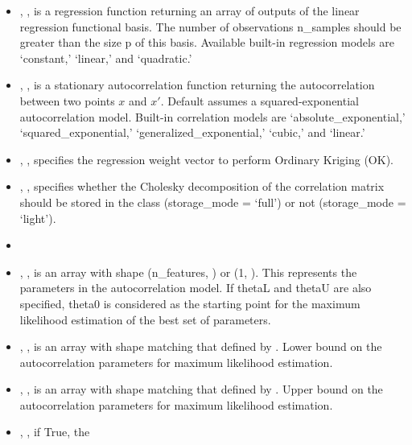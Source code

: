 
\begin{itemize}
  \item {}, , is a regression
  function returning an array of outputs of the linear regression functional
  basis.
  The number of observations n\_samples should be greater than the size p of
  this basis.
  Available built-in regression models are `constant,' `linear,' and
  `quadratic.'
  \item {}, , is a stationary
  autocorrelation function returning the autocorrelation between two points $x$
  and $x'$.
  Default assumes a squared-exponential autocorrelation model.
  Built-in correlation models are `absolute\_exponential,'
  `squared\_exponential,' `generalized\_exponential,' `cubic,' and `linear.'
  \item {}, , specifies
  the regression weight vector to perform Ordinary Kriging (OK).
  \item {}, , specifies
  whether the Cholesky decomposition of the correlation matrix should be stored
  in the class (storage\_mode = `full') or not (storage\_mode = `light').
  \item {}
  \item {}, , is an
  array with shape (n\_features, ) or (1, ).
  This represents the parameters in the autocorrelation model.
  If thetaL and thetaU are also specified, theta0 is considered as the starting
  point for the maximum likelihood estimation of the best set of parameters.
  \item {}, , is an
  array with shape matching that defined by .
  Lower bound on the autocorrelation parameters for maximum likelihood
  estimation.
  \item {}, , is an
  array with shape matching that defined by .
  Upper bound on the autocorrelation parameters for maximum likelihood
  estimation.
  \item {}, , if True, the

\end{itemize}
